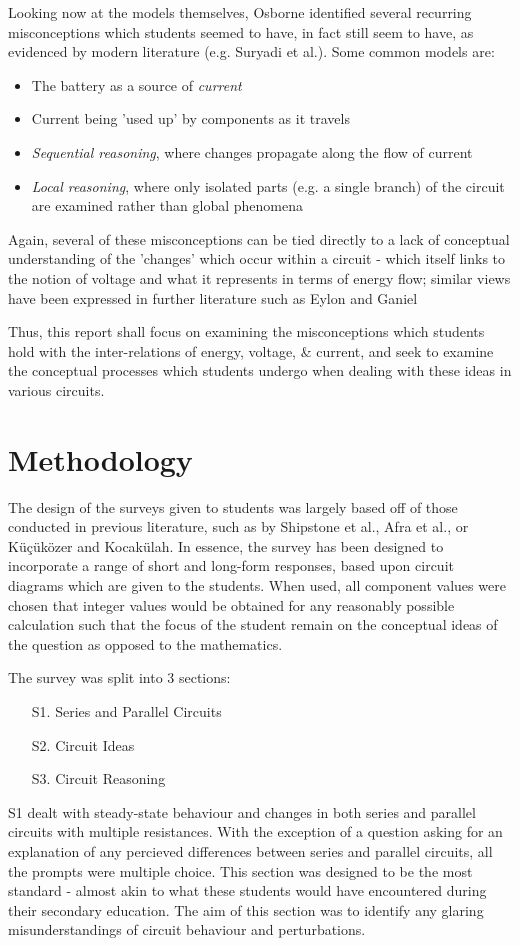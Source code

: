 \documentclass[a4paper,openany,nobib]{tufte-book}
\begin{document}
Looking now at the models themselves, Osborne\autocite{osb} identified several recurring misconceptions which students seemed to have, in fact still seem to have, as evidenced by modern literature (e.g. Suryadi et al.\autocite{suryadi2020}). 
Some common models are:
\begin{itemize}
	\item The battery as a source of \emph{current} 
	\item Current being 'used up' by components as it travels
	\item \emph{Sequential reasoning}, where changes propagate along the flow of current
	\item \emph{Local reasoning}, where only isolated parts (e.g. a single branch) of the circuit are examined rather than global phenomena
\end{itemize}
Again, several of these misconceptions can be tied directly to a lack of conceptual understanding of the 'changes' which occur within a circuit - which itself links to the notion of voltage and what it represents in terms of energy flow; similar views have been expressed in further literature such as Eylon and Ganiel\autocite{eylon1990}

Thus, this report shall focus on examining the misconceptions which students hold with the inter-relations of energy, voltage, \& current, and seek to examine the conceptual processes which students undergo when dealing with these ideas in various circuits.
\newpage
\chapter{Methodology}%
The design of the surveys given to students was largely based off of those conducted in previous literature, such as by Shipstone et al., Afra et al., or Küçüközer and Kocakülah\autocite{shipstone_europe,afra2009,kucu2007}. In essence, the survey has been designed to incorporate a range of short and long-form responses, based upon circuit diagrams which are given to the students. When used, all component values were chosen that integer values would be obtained for any reasonably possible calculation such that the focus of the student remain on the conceptual ideas of the question as opposed to the mathematics.

The survey was split into 3 sections:
\begin{itemize}
	\item[S1.] Series and Parallel Circuits
	\item[S2.] Circuit Ideas
	\item[S3.] Circuit Reasoning
\end{itemize}
S1 dealt with steady-state behaviour and changes in both series and parallel circuits with multiple resistances. With the exception of a question asking for an explanation of any percieved differences between series and parallel circuits, all the prompts were multiple choice. This section was designed to be the most standard - almost akin to what these students would have encountered during their secondary education. The aim of this section was to identify any glaring misunderstandings of circuit behaviour and perturbations.
\end{document}
